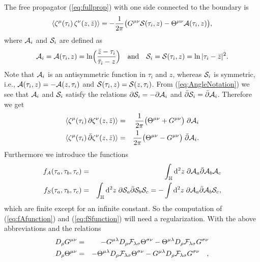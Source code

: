 \documentclass[a4paper,12pt]{article}
\let\bra=\langle        \let\ket=\rangle
\newcommand {\ud} {\mathrm{d}}
\newcommand {\cF} {{\cal F}}
\newcommand {\cA}{{\cal A}}
\newcommand {\cS}{{\cal S}}
\newcommand {\bbH}{\mathbb{H}}
\begin{document}
The free propagator (\ref{eq:fullprop}) with one side connected to the 
boundary is
\begin{eqnarray}
  \label{eq:AngleFunc}
  \bra\zeta^\mu(\tau_i)\,\zeta^\nu(z,\bar z)\ket =
  - \frac{1}{2\pi}\bigl(
  G^{\mu\nu} \cS(\tau_i,z) - \Theta^{\mu\nu} \cA(\tau_i,z)
  \bigr) ,
\end{eqnarray}
where $\cA_i$ and $\cS_i$ are defined as
\begin{eqnarray}
  \label{eq:AngleNotation}
  \cA_i =\cA(\tau_i,z)=\ln\Bigl(\frac{\bar z - \tau_i}{\bar \tau_i - z}\Bigr)
  \quad \textrm{and} \quad \cS_i = \cS(\tau_i,z) = \ln |\tau_i - \bar z|^2
  .
\end{eqnarray}
Note that $\cA_i$ is an antisymmetric function in $\tau_i$ and $z$, 
whereas $\cS_i$ is symmetric, i.e., $\cA(\tau_i,z) = -\cA(z,\tau_i)$ and
$\cS(\tau_i,z) = \cS(z,\tau_i)$. From (\ref{eq:AngleNotation}) we see that
$\cA_i$ and $\cS_i$ satisfy the relations 
$\partial \cS_i = - \partial \cA_i$ and 
$\bar\partial \cS_i = \bar\partial \cA_i$. Therefore we get
\begin{eqnarray}
  \label{eq:derivAngleFunc}
  \bra\zeta^\mu(\tau_i) \, \partial \zeta^\nu(z,\bar z)\ket &=&
    \frac{1}{2\pi} \bigl(\Theta^{\mu\nu} + G^{\mu\nu}\bigr)
    \;\partial \cA_i  \nonumber \\
  \bra\zeta^\mu(\tau_i) \, \bar\partial \zeta^\nu(z,\bar z)\ket &=&
    \frac{1}{2\pi} \bigl(\Theta^{\mu\nu} - G^{\mu\nu}\bigr)
    \;\bar\partial \cA_i .
\end{eqnarray}
Furthermore we introduce the functions
\begin{eqnarray}
  \label{eq:fAfunction}
  f_A(\tau_a,\tau_b,\tau_c) &=& 
  \int _\bbH \ud^2 z \; \partial \cA_a \bar \partial \cA_b \cA_c \\
  \label{eq:fSfunction}
  f_S(\tau_a,\tau_b,\tau_c) &=&
  \int _\bbH \ud^2 z \; \partial \cS_a \bar \partial \cS_b \cS_c =
  - \int \ud^2 z \; \partial \cA_a \bar \partial \cA_b \cS_c ,
\end{eqnarray}
which are finite except for an infinite constant. So the computation of
(\ref{eq:fAfunction}) and (\ref{eq:fSfunction}) will need a regularization.
With the above abbreviations and the relations 
\begin{eqnarray}
  \label{eq:derivGTheta}
  D_\rho G^{\mu\nu} &=&
     - G^{\mu\lambda} D_\rho\cF_{\lambda\sigma} \Theta^{\sigma\nu}
     - \Theta^{\mu\lambda} D_\rho\cF_{\lambda\sigma} G^{\sigma\nu}
     \nonumber \\
  D_\rho \Theta^{\mu\nu} &=&
     - \Theta^{\mu\lambda} D_\rho\cF_{\lambda\sigma} 
       \Theta^{\sigma\nu}
     - G^{\mu\lambda} D_\rho\cF_{\lambda\sigma} G^{\sigma\nu}
     \quad,
\end{eqnarray}
\end{document}
